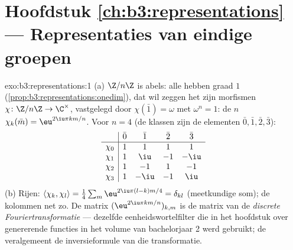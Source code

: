 \section*{Hoofdstuk \ref{ch:b3:representations} --- Representaties
van eindige groepen}

\begin{solution}{exo:b3:representations:1}
(a) $\Z/n\Z$ is abels: alle  hebben
graad $1$ (\cref{prop:b3:representations:onedim}), dat wil zeggen
het zijn morfismen $\chi \colon \Z/n\Z \to \C^\times$, vastgelegd
door $\chi(\bar 1) = \omega$ met $\omega^n = 1$: de $n$ 
$\chi_k(\bar m) = \eu^{2\iu\pi km/n}$. Voor $n = 4$ (de klassen
zijn de elementen $\bar0,\bar1,\bar2,\bar3$):
\[
\begin{array}{c|cccc}
& \bar0 & \bar1 & \bar2 & \bar3\\
\hline
\chi_0 & 1 & 1 & 1 & 1\\
\chi_1 & 1 & \iu & -1 & -\iu\\
\chi_2 & 1 & -1 & 1 & -1\\
\chi_3 & 1 & -\iu & -1 & \iu
\end{array}
\]
(b) Rijen: $\langle\chi_k,\chi_l\rangle = \frac14\sum_m
\eu^{2\iu\pi(l-k)m/4} = \delta_{kl}$ (meetkundige som); de
kolommen net zo. De matrix $(\eu^{2\iu\pi km/n})_{k,m}$ is de
matrix van de \emph{discrete Fouriertransformatie} --- dezelfde
eenheidswortelfilter die in het hoofdstuk over genererende
functies in het volume van bachelorjaar 2 werd gebruikt; de
 veralgemeent de inversieformule van
die transformatie.
\end{solution}

